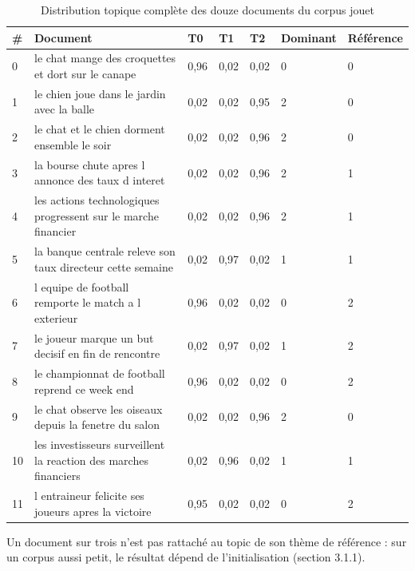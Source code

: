 \begin{table}[H]
\centering
\scriptsize
\setlength{\tabcolsep}{0.08cm}
\begin{tabular}{|p{0.5cm}|p{7.6cm}|p{0.9cm}|p{0.9cm}|p{0.9cm}|p{1.3cm}|p{1.3cm}|}
\hline
\textbf{\#} & \textbf{Document} & \textbf{T0} & \textbf{T1} & \textbf{T2} & \textbf{Dominant} & \textbf{Référence} \\
\hline
0 & le chat mange des croquettes et dort sur le canape & 0,96 & 0,02 & 0,02 & 0 & 0 \\
\hline
1 & le chien joue dans le jardin avec la balle & 0,02 & 0,02 & 0,95 & 2 & 0 \\
\hline
2 & le chat et le chien dorment ensemble le soir & 0,02 & 0,02 & 0,96 & 2 & 0 \\
\hline
3 & la bourse chute apres l annonce des taux d interet & 0,02 & 0,02 & 0,96 & 2 & 1 \\
\hline
4 & les actions technologiques progressent sur le marche financier & 0,02 & 0,02 & 0,96 & 2 & 1 \\
\hline
5 & la banque centrale releve son taux directeur cette semaine & 0,02 & 0,97 & 0,02 & 1 & 1 \\
\hline
6 & l equipe de football remporte le match a l exterieur & 0,96 & 0,02 & 0,02 & 0 & 2 \\
\hline
7 & le joueur marque un but decisif en fin de rencontre & 0,02 & 0,97 & 0,02 & 1 & 2 \\
\hline
8 & le championnat de football reprend ce week end & 0,96 & 0,02 & 0,02 & 0 & 2 \\
\hline
9 & le chat observe les oiseaux depuis la fenetre du salon & 0,02 & 0,02 & 0,96 & 2 & 0 \\
\hline
10 & les investisseurs surveillent la reaction des marches financiers & 0,02 & 0,96 & 0,02 & 1 & 1 \\
\hline
11 & l entraineur felicite ses joueurs apres la victoire & 0,95 & 0,02 & 0,02 & 0 & 2 \\
\hline
\end{tabular}
\caption{Distribution topique complète des douze documents du corpus jouet}
\end{table}
Un document sur trois n'est pas rattaché au topic de son thème de référence : sur un corpus aussi petit, le résultat dépend de l'initialisation (section 3.1.1).

